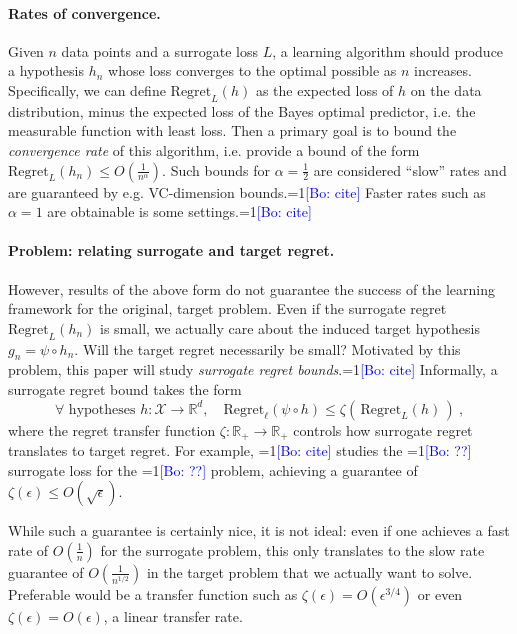 \documentclass{article}
\newcommand{\Comments}{1}
\newcommand{\mynote}[2]{\ifnum\Comments=1\textcolor{#1}{#2}\fi}
\newcommand{\bo}[1]{\mynote{blue}{[Bo: #1]}}
\newcommand{\reals}{\mathbb{R}}
\newcommand{\X}{\mathcal{X}}
\begin{document}
\paragraph{Rates of convergence.}
Given $n$ data points and a surrogate loss $L$, a learning algorithm should produce a hypothesis $h_n$ whose loss converges to the optimal possible as $n$ increases.
Specifically, we can define $\mathrm{Regret}_{L}(h)$ as the expected loss of $h$ on the data distribution, minus the expected loss of the Bayes optimal predictor, i.e. the measurable function with least loss.
Then a primary goal is to bound the \emph{convergence rate} of this algorithm, i.e. provide a bound of the form $\mathrm{Regret}_{L}(h_n) \leq O\left(\tfrac{1}{n^{\alpha}}\right)$.
Such bounds for $\alpha = \tfrac{1}{2}$ are considered ``slow'' rates and are guaranteed by e.g. VC-dimension bounds.\bo{cite}
Faster rates such as $\alpha = 1$ are obtainable is some settings.\bo{cite}

\paragraph{Problem: relating surrogate and target regret.}
However, results of the above form do not guarantee the success of the learning framework for the original, target problem.
Even if the surrogate regret $\mathrm{Regret}_L(h_n)$ is small, we actually care about the induced target hypothesis $g_n = \psi \circ h_n$.
Will the target regret necessarily be small?
Motivated by this problem, this paper will study \emph{surrogate regret bounds}.\bo{cite}
Informally, a surrogate regret bound takes the form
\begin{equation}
  \label{eq:surrogate-regret-bound-informal}
  \forall \text{ hypotheses } h:\X\to\reals^d, \quad \mathrm{Regret}_\ell(\psi\circ h) \leq \zeta(\, \mathrm{Regret}_L(h) \,)~,
\end{equation}
where the regret transfer function $\zeta : \reals_+ \to \reals_+$ controls how surrogate regret translates to target regret.
For example, \bo{cite} studies the \bo{??} surrogate loss for the \bo{??} problem, achieving a guarantee of $\zeta(\epsilon) \leq O\left(\sqrt{\epsilon}\right)$.

While such a guarantee is certainly nice, it is not ideal: even if one achieves a fast rate of $O(\tfrac{1}{n})$ for the surrogate problem, this only translates to the slow rate guarantee of $O(\tfrac{1}{n^{1/2}})$ in the target problem that we actually want to solve.
Preferable would be a transfer function such as $\zeta(\epsilon) = O(\epsilon^{3/4})$ or even $\zeta(\epsilon) = O(\epsilon)$, a linear transfer rate.
\end{document}

